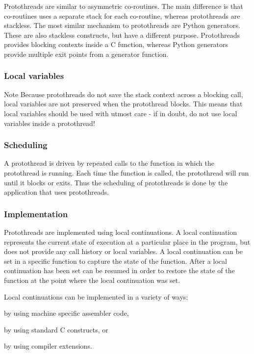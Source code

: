 \-Protothreads are similar to asymmetric co-\/routines. \-The main difference is that co-\/routines uses a separate stack for each co-\/routine, whereas protothreads are stackless. \-The most similar mechanism to protothreads are \-Python generators. \-These are also stackless constructs, but have a different purpose. \-Protothreads provides blocking contexts inside a \-C function, whereas \-Python generators provide multiple exit points from a generator function.\hypertarget{a00052_pt-autovars}{}\subsubsection{\-Local variables}\label{a00052_pt-autovars}
\begin{DoxyNote}{\-Note}
\-Because protothreads do not save the stack context across a blocking call, local variables are not preserved when the protothread blocks. \-This means that local variables should be used with utmost care -\/ if in doubt, do not use local variables inside a protothread!
\end{DoxyNote}
\hypertarget{a00052_pt-scheduling}{}\subsubsection{\-Scheduling}\label{a00052_pt-scheduling}
\-A protothread is driven by repeated calls to the function in which the protothread is running. \-Each time the function is called, the protothread will run until it blocks or exits. \-Thus the scheduling of protothreads is done by the application that uses protothreads.\hypertarget{a00052_pt-impl}{}\subsubsection{\-Implementation}\label{a00052_pt-impl}
\-Protothreads are implemented using local continuations. \-A local continuation represents the current state of execution at a particular place in the program, but does not provide any call history or local variables. \-A local continuation can be set in a specific function to capture the state of the function. \-After a local continuation has been set can be resumed in order to restore the state of the function at the point where the local continuation was set.

\-Local continuations can be implemented in a variety of ways\-:


\begin{DoxyEnumerate}
\item by using machine specific assembler code,
\item by using standard \-C constructs, or
\item by using compiler extensions.
\end{DoxyEnumerate}

